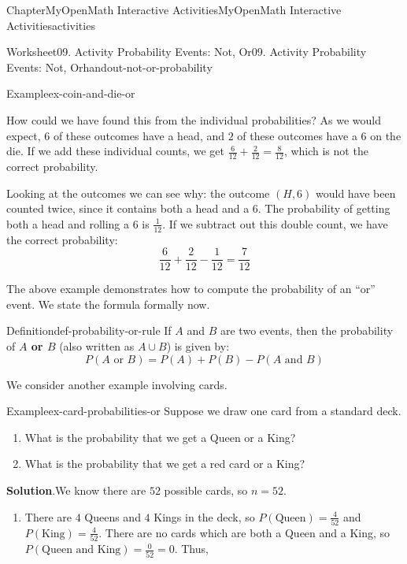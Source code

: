 \documentclass[oneside,10pt,]{book}
\newcommand{\blocktitlefont}{\relax}
\newcommand{\terminology}[1]{\textbf{#1}}
\begin{document}
\begin{chapterptx}{Chapter}{MyOpenMath Interactive Activities}{}{MyOpenMath Interactive Activities}{}{}{activities}
\begin{worksheet-section}{Worksheet}{09. Activity Probability Events: Not, Or}{}{09. Activity Probability Events: Not, Or}{}{}{handout-not-or-probability}
\begin{example}{Example}{}{ex-coin-and-die-or}
\par
How could we have found this from the individual probabilities? As we would expect, \(6\) of these outcomes have a head, and \(2\) of these outcomes have a 6 on the die. If we add these individual counts, we get \(\frac{6}{12} + \frac{2}{12} = \frac{8}{12}\), which is not the correct probability.%
\par
Looking at the outcomes we can see why: the outcome \((H,6)\) would have been counted twice, since it contains both a head and a 6. The probability of getting both a head and rolling a 6 is \(\frac{1}{12}\). If we subtract out this double count, we have the correct probability:%
\begin{equation*}
\frac{6}{12} + \frac{2}{12} - \frac{1}{12} = \frac{7}{12}
\end{equation*}
%
\end{example}
The above example demonstrates how to compute the probability of an \textquotedblleft{}or\textquotedblright{} event. We state the formula formally now.%
\begin{definition}{Definition}{}{def-probability-or-rule}%
If \(A\) and \(B\) are two events, then the probability of \terminology{\(A\) or \(B\)} (also written as \(A \cup B\)) is given by:%
\begin{equation*}
P(A \text{ or } B) = P(A) + P(B) - P(A \text{ and } B)
\end{equation*}
%
\end{definition}
We consider another example involving cards.%
\begin{example}{Example}{}{ex-card-probabilities-or}%
Suppose we draw one card from a standard deck.%
\begin{enumerate}[label={\alph*}]
\item{}What is the probability that we get a Queen or a King?%
\item{}What is the probability that we get a red card or a King?%
\end{enumerate}
%
\par\smallskip%
\noindent\textbf{\blocktitlefont Solution}.\hypertarget{ex-card-probabilities-or-2}{}\quad{}We know there are \(52\) possible cards, so \(n = 52\).%
\par
%
\begin{enumerate}[label={\alph*}]
\item{}There are \(4\) Queens and \(4\) Kings in the deck, so \(P(\text{Queen}) = \frac{4}{52}\) and \(P(\text{King}) = \frac{4}{52}\). There are no cards which are both a Queen and a King, so \(P(\text{Queen and King}) = \frac{0}{52} = 0\). Thus,%

\end{enumerate}
\end{example}
\end{worksheet-section}
\end{chapterptx}
\end{document}
